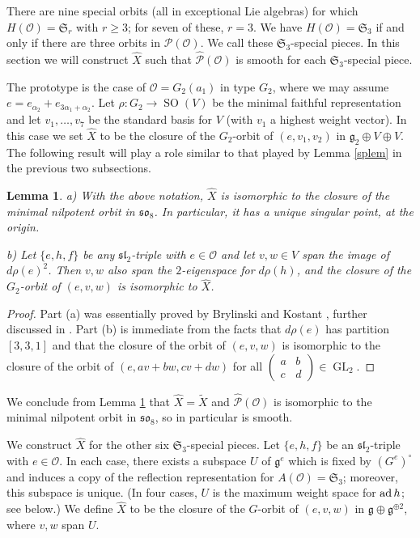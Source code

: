 \documentclass{amsart}
\newtheorem{lemma}[theorem]{Lemma}
\theoremstyle{definition}
\DeclareMathOperator{\GL}{GL}
\DeclareMathOperator{\SO}{SO}
\newcommand{\g}{\mathfrak{g}}
\newcommand{\0}{\mathcal{O}}
\begin{document}
There are nine special orbits (all in exceptional Lie algebras) for which $H(\0)=\mathfrak{S}_r$ with $r\geq 3$; for seven of these, $r=3$.
We have $H(\0)=\mathfrak{S}_3$ if and only if there are three orbits in ${\mathcal P}(\0)$.
We call these $\mathfrak{S}_3$-special pieces.
In this section we will construct $\hat{X}$ such that $\hat{\mathcal P}(\0)$ is smooth for each $\mathfrak{S}_3$-special piece.

The prototype is the case of $\0=G_2(a_1)$ in type $G_2$, where we may assume $e=e_{\alpha_2}+e_{3\alpha_1+\alpha_2}$.
Let $\rho:G_2\rightarrow\SO(V)$ be the minimal faithful representation and let $v_1,\ldots ,v_7$ be the standard basis for $V$ (with $v_1$ a highest weight vector).
In this case we set $\hat{X}$ to be the closure of the $G_2$-orbit of $(e,v_1,v_2)$ in $\g_2\oplus V\oplus V$.
The following result will play a role similar to that played by Lemma \ref{splem} in the previous two subsections.

\begin{lemma}\label{G2lem}
a) With the above notation, $\hat{X}$ is isomorphic to the closure of the minimal nilpotent orbit in $\mathfrak{so}_8$.
In particular, it has a unique singular point, at the origin.

b) Let $\{ e,h,f\}$ be any $\mathfrak{sl}_2$-triple with $e\in\0$ and let $v,w\in V$ span the image of $d\rho(e)^2$.
Then $v,w$ also span the $2$-eigenspace for $d\rho(h)$, and the closure of the $G_2$-orbit of $(e,v,w)$ is isomorphic to $\hat{X}$.
\end{lemma}

\begin{proof}
Part (a) was essentially proved by Brylinski and Kostant \cite{Brylinski-Kostant:JAMS}, further discussed in \cite[\S 2.3.5]{FJLS23}.
Part (b) is immediate from the facts that $d\rho(e)$ has partition $[3,3,1]$ and that the closure of the orbit of $(e,v,w)$ is isomorphic to the closure of the orbit of $(e,av+bw,cv+dw)$ for all $\begin{pmatrix} a & b \\ c & d \end{pmatrix}\in\GL_2$.
\end{proof}

We conclude from Lemma \ref{G2lem} that $\hat{X}=\widetilde{X}$ and $\hat{\mathcal P}(\0)$ is isomorphic to the minimal nilpotent orbit in $\mathfrak{so}_8$, so in particular is smooth.

We construct $\hat{X}$ for the other six $\mathfrak{S}_3$-special pieces.
Let $\{ e,h,f\}$ be an $\mathfrak{sl}_2$-triple with $e\in\0$.
In each case, there exists a subspace $U$ of $\g^e$ which is fixed by $(G^e)^\circ$ and induces a copy of the reflection representation for $A(\0)=\mathfrak{S}_3$; moreover, this subspace is unique.
(In four cases, $U$ is the maximum weight space for ${\rm ad}\, h$; see below.)
We define $\hat{X}$ to be the closure of the $G$-orbit of $(e,v,w)$ in $\g\oplus \g^{\oplus 2}$, where $v,w$ span $U$.
\end{document}
